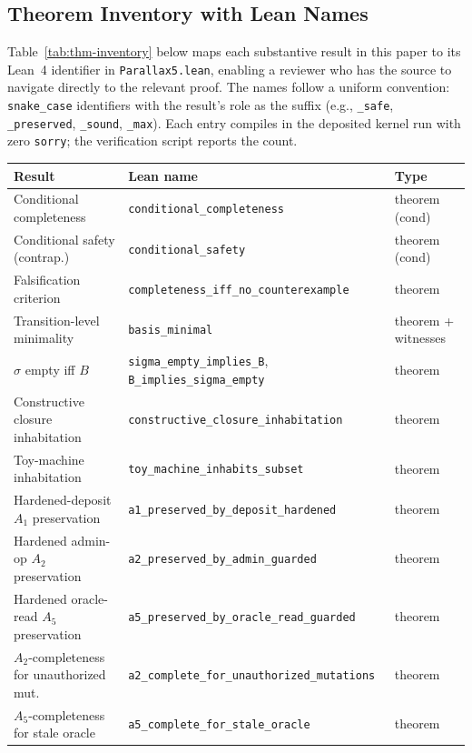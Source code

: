 \documentclass[11pt,a4paper]{article}
\begin{document}
\subsection{Theorem Inventory with Lean Names}

Table~\ref{tab:thm-inventory} below maps each substantive result in this paper to its Lean~4 identifier in \texttt{Parallax5.lean}, enabling a reviewer who has the source to navigate directly to the relevant proof. The names follow a uniform convention: \texttt{snake\_case} identifiers with the result's role as the suffix (e.g., \texttt{\_safe}, \texttt{\_preserved}, \texttt{\_sound}, \texttt{\_max}). Each entry compiles in the deposited kernel run with zero \texttt{sorry}; the verification script reports the count.

\begin{table}[h]
\centering
\footnotesize
\begin{tabular}{lll}
\toprule
Result & Lean name & Type \\
\midrule
Conditional completeness & \texttt{conditional\_completeness} & theorem (cond) \\
Conditional safety (contrap.) & \texttt{conditional\_safety} & theorem (cond) \\
Falsification criterion & \texttt{completeness\_iff\_no\_counterexample} & theorem \\
Transition-level minimality & \texttt{basis\_minimal} & theorem + witnesses \\
$\sigma$ empty iff $B$ & \texttt{sigma\_empty\_implies\_B}, \texttt{B\_implies\_sigma\_empty} & theorem \\
Constructive closure inhabitation & \texttt{constructive\_closure\_inhabitation} & theorem \\
Toy-machine inhabitation & \texttt{toy\_machine\_inhabits\_subset} & theorem \\
Hardened-deposit $A_1$ preservation & \texttt{a1\_preserved\_by\_deposit\_hardened} & theorem \\
Hardened admin-op $A_2$ preservation & \texttt{a2\_preserved\_by\_admin\_guarded} & theorem \\
Hardened oracle-read $A_5$ preservation & \texttt{a5\_preserved\_by\_oracle\_read\_guarded} & theorem \\
$A_2$-completeness for unauthorized mut. & \texttt{a2\_complete\_for\_unauthorized\_mutations} & theorem \\
$A_5$-completeness for stale oracle & \texttt{a5\_complete\_for\_stale\_oracle} & theorem \\

\end{tabular}
\end{table}
\end{document}
